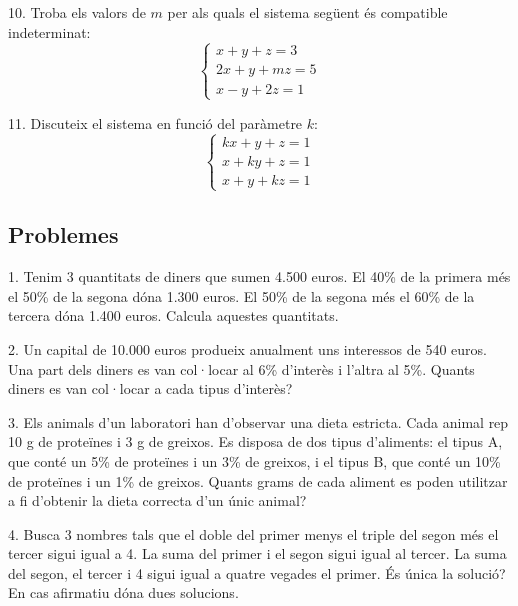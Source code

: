\documentclass[12pt]{article}
\begin{document}
\begin{exercici}
10. Troba els valors de \(m\) per als quals el sistema següent és compatible indeterminat:
\[
\begin{cases}
x + y + z = 3 \\
2x + y + mz = 5 \\
x - y + 2z = 1
\end{cases}
\]
\end{exercici}

\begin{exercici}
11. Discuteix el sistema en funció del paràmetre \(k\):
\[
\begin{cases}
kx + y + z = 1 \\
x + ky + z = 1 \\
x + y + kz = 1
\end{cases}
\]
\end{exercici}

\subsection*{Problemes}

\begin{exercici}
1. Tenim 3 quantitats de diners que sumen 4.500 euros. El 40\% de la primera més el 50\% de la segona dóna 1.300 euros. El 50\% de la segona més el 60\% de la tercera dóna 1.400 euros. Calcula aquestes quantitats.
\end{exercici}

\begin{exercici}
2. Un capital de 10.000 euros produeix anualment uns interessos de 540 euros. Una part dels diners es van col·locar al 6\% d’interès i l’altra al 5\%. Quants diners es van col·locar a cada tipus d’interès?
\end{exercici}

\begin{exercici}
3. Els animals d’un laboratori han d’observar una dieta estricta. Cada animal rep 10 g de proteïnes i 3 g de greixos. Es disposa de dos tipus d’aliments: el tipus A, que conté un 5\% de proteïnes i un 3\% de greixos, i el tipus B, que conté un 10\% de proteïnes i un 1\% de greixos. Quants grams de cada aliment es poden utilitzar a fi d’obtenir la dieta correcta d’un únic animal?
\end{exercici}

\begin{exercici}
4. Busca 3 nombres tals que el doble del primer menys el triple del segon més el tercer sigui igual a 4. La suma del primer i el segon sigui igual al tercer. La suma del segon, el tercer i 4 sigui igual a quatre vegades el primer. És única la solució? En cas afirmatiu dóna dues solucions.
\end{exercici}
\end{document}
